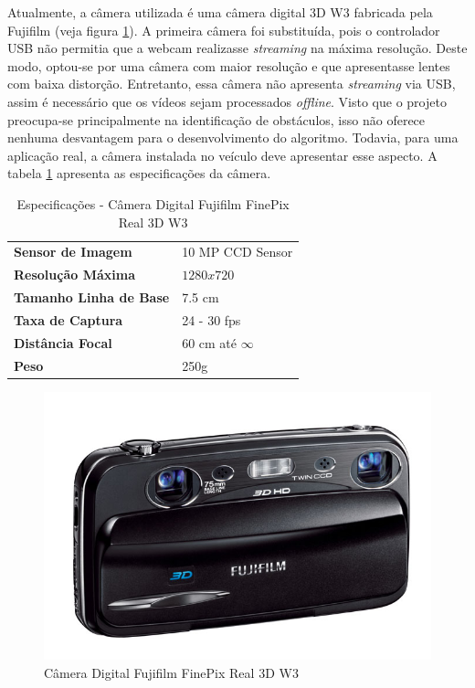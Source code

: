 Atualmente, a câmera utilizada é uma câmera digital 3D W3 fabricada pela Fujifilm (veja figura \ref{fujiW3}). A primeira câmera foi substituída, pois o controlador USB não permitia que a webcam realizasse \textit{streaming} na máxima resolução. Deste modo, optou-se por uma câmera com maior resolução e que apresentasse lentes com baixa distorção. Entretanto, essa câmera não apresenta \textit{streaming} via USB, assim é necessário que os vídeos sejam processados \textit{offline}. Visto que o projeto preocupa-se principalmente na identificação de obstáculos, isso não oferece nenhuma desvantagem para o desenvolvimento do algoritmo. Todavia, para uma aplicação real, a câmera instalada no veículo deve apresentar esse aspecto. A tabela \ref{fujiW3_tab} apresenta as especificações da câmera.

\begin{table}[]
\centering
\caption{Especificações - Câmera Digital Fujifilm FinePix Real 3D W3}
\label{fujiW3_tab}
\begin{tabular}{ll}
\textbf{Sensor de Imagem}      & 10 MP CCD Sensor  	\\
\textbf{Resolução Máxima}      & $1280x720$        	\\
\textbf{Tamanho Linha de Base} & 7.5 cm             	\\
\textbf{Taxa de Captura}      & 24 - 30 fps          \\
\textbf{Distância Focal}       & 60 cm até $\infty$	\\
\textbf{Peso}       		      & 250g					\\
\end{tabular}
\end{table}

\begin{figure}[H]
 	\centering
 	\includegraphics[scale=0.35]{./Resources/fujiW3.jpg}
 	\caption{Câmera Digital Fujifilm FinePix Real 3D W3}
 	\label{fujiW3}
\end{figure}

